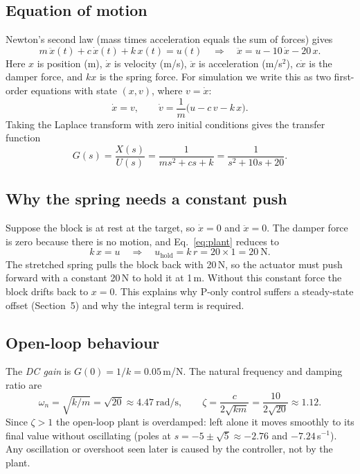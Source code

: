 \documentclass[10pt]{article}
\begin{document}
	\subsection{Equation of motion}
	Newton's second law (mass times acceleration equals the sum of forces) gives
	\begin{equation}
		m\,\ddot{x}(t) + c\,\dot{x}(t) + k\,x(t) = u(t)
		\quad\Longrightarrow\quad
		\ddot{x} = u - 10\,\dot{x} - 20\,x .
		\label{eq:plant}
	\end{equation}
	Here $x$ is position (m), $\dot{x}$ is velocity (m/s), $\ddot{x}$ is acceleration (m/s$^2$), $c\dot{x}$ is the damper force, and $kx$ is the spring force. For simulation we write this as two first-order equations with state $(x, v)$, where $v=\dot{x}$:
	\begin{equation}
		\dot{x} = v, \qquad
		\dot{v} = \frac{1}{m}\bigl(u - c\,v - k\,x\bigr).
	\end{equation}
	Taking the Laplace transform with zero initial conditions gives the transfer function
	\begin{equation}
		G(s) = \frac{X(s)}{U(s)} = \frac{1}{m s^2 + c s + k} = \frac{1}{s^2 + 10 s + 20}.
	\end{equation}
	
	\subsection{Why the spring needs a constant push}
	Suppose the block is at rest at the target, so $\dot{x}=0$ and $\ddot{x}=0$. The damper force is zero because there is no motion, and Eq.~\eqref{eq:plant} reduces to
	\begin{equation}
		k\,x = u \quad\Longrightarrow\quad u_{\text{hold}} = k\, r = 20 \times 1 = 20\ \text{N}.
	\end{equation}
	The stretched spring pulls the block back with 20\,N, so the actuator must push forward with a constant 20\,N to hold it at 1\,m. Without this constant force the block drifts back to $x=0$. This explains why P-only control suffers a steady-state offset (Section~5) and why the integral term is required.
	
	\subsection{Open-loop behaviour}
	The \emph{DC gain} is $G(0) = 1/k = 0.05$\,m/N. The natural frequency and damping ratio are
	\begin{equation}
		\omega_n = \sqrt{k/m} = \sqrt{20} \approx 4.47\ \text{rad/s}, \qquad
		\zeta = \frac{c}{2\sqrt{km}} = \frac{10}{2\sqrt{20}} \approx 1.12 .
	\end{equation}
	Since $\zeta > 1$ the open-loop plant is overdamped: left alone it moves smoothly to its final value without oscillating (poles at $s = -5 \pm \sqrt{5} \approx -2.76$ and $-7.24$\,s$^{-1}$). Any oscillation or overshoot seen later is caused by the controller, not by the plant.
	
\end{document}
